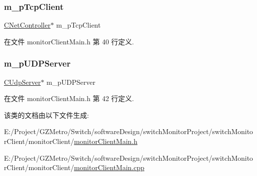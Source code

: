 \subsubsection{\texorpdfstring{m\+\_\+p\+Tcp\+Client}{m\_pTcpClient}}
{\footnotesize\ttfamily \hyperlink{class_c_net_controller}{C\+Net\+Controller}$\ast$ m\+\_\+p\+Tcp\+Client\hspace{0.3cm}{\ttfamily [private]}}



在文件 monitor\+Client\+Main.\+h 第 40 行定义.

\mbox{\label{classmonitor_client_frame_ab309fd5f3ceaece3a9991aa37c2d72f9}} 
\subsubsection{\texorpdfstring{m\+\_\+p\+U\+D\+P\+Server}{m\_pUDPServer}}
{\footnotesize\ttfamily \hyperlink{class_c_udp_server}{C\+Udp\+Server}$\ast$ m\+\_\+p\+U\+D\+P\+Server\hspace{0.3cm}{\ttfamily [private]}}



在文件 monitor\+Client\+Main.\+h 第 42 行定义.



该类的文档由以下文件生成\+:\begin{DoxyCompactItemize}
\item 
E\+:/\+Project/\+G\+Z\+Metro/\+Switch/software\+Design/switch\+Monitor\+Project/switch\+Monitor\+Client/monitor\+Client/\hyperlink{monitor_client_main_8h}{monitor\+Client\+Main.\+h}\item 
E\+:/\+Project/\+G\+Z\+Metro/\+Switch/software\+Design/switch\+Monitor\+Project/switch\+Monitor\+Client/monitor\+Client/\hyperlink{monitor_client_main_8cpp}{monitor\+Client\+Main.\+cpp}\end{DoxyCompactItemize}

